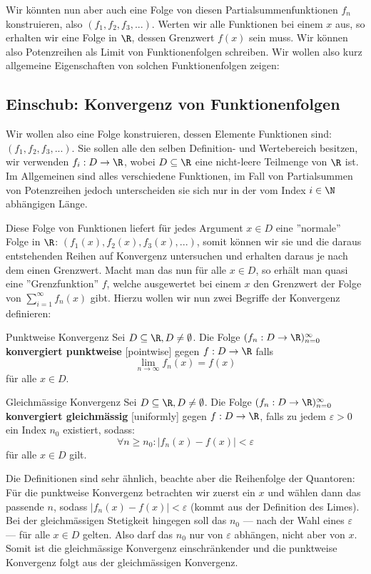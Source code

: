 Wir könnten nun aber auch eine Folge von diesen Partialsummenfunktionen $f_n$ konstruieren, also $(f_1, f_2, f_3, ...)$. Werten wir alle Funktionen bei einem $x$ aus, so erhalten wir eine Folge in $\R$, dessen Grenzwert $f(x)$ sein muss. Wir können also Potenzreihen als Limit von Funktionenfolgen schreiben. Wir wollen also kurz allgemeine Eigenschaften von solchen Funktionenfolgen zeigen:

\subsection{Einschub: Konvergenz von Funktionenfolgen}\label{cha_funktionenfolgen}
Wir wollen also eine Folge konstruieren, dessen Elemente Funktionen sind: $(f_1, f_2, f_3, ...)$. Sie sollen alle den selben Definition- und Wertebereich besitzen, wir verwenden $f_i: D \to \R$, wobei $D \subseteq \R$ eine nicht-leere Teilmenge von $\R$ ist. Im Allgemeinen sind alles verschiedene Funktionen, im Fall von Partialsummen von Potenzreihen jedoch unterscheiden sie sich nur in der vom Index $i \in \N$ abhängigen Länge.

Diese Folge von Funktionen liefert für jedes Argument $x \in D$ eine ''normale'' Folge in $\R$: $(f_1(x), f_2(x), f_3(x), ...)$, somit können wir sie und die daraus entstehenden Reihen auf Konvergenz untersuchen und erhalten daraus je nach dem einen Grenzwert. Macht man das nun für alle $x \in D$, so erhält man quasi eine ''Grenzfunktion'' $f$, welche ausgewertet bei einem $x$ den Grenzwert der Folge von $\sum_{i=1}^\infty f_n(x)$ gibt. Hierzu wollen wir nun zwei Begriffe der Konvergenz definieren:

\begin{definition}{Punktweise Konvergenz}{}
Sei $D \subseteq \R, D \neq \emptyset$. Die Folge $(f_n:D \to \R)^\infty_{n=0}$ \textbf{konvergiert punktweise} [pointwise] gegen $f: D \to \R$ falls
$$\lim_{n \to \infty} f_n(x) = f(x)$$
für alle $x \in D$.
\end{definition}

\begin{definition}{Gleichmässige Konvergenz}{}
Sei $D \subseteq \R, D \neq \emptyset$. Die Folge $(f_n:D \to \R)^\infty_{n=0}$ \textbf{konvergiert gleichmässig} [uniformly] gegen $f: D \to \R$, falls zu jedem $\varepsilon >0$ ein Index $n_0$ existiert, sodass:
$$\forall n\geq n_0: |f_n(x) - f(x)| < \varepsilon $$
für alle $x \in D$ gilt.
\end{definition}
\begin{remark}
Die Definitionen sind sehr ähnlich, beachte aber die Reihenfolge der Quantoren: Für die punktweise Konvergenz betrachten wir zuerst ein $x$ und wählen dann das passende $n$, sodass $|f_n(x)-f(x)| < \varepsilon$ (kommt aus der Definition des Limes). Bei der gleichmässigen Stetigkeit hingegen soll das $n_0$ --- nach der Wahl eines $\varepsilon$ --- für alle $x \in D$ gelten. Also darf das $n_0$ nur von $\varepsilon$ abhängen, nicht aber von $x$. Somit ist die gleichmässige Konvergenz einschränkender und die punktweise Konvergenz folgt aus der gleichmässigen Konvergenz.
\end{remark}

